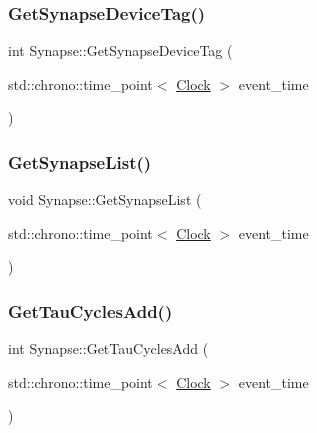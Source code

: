 \mbox{\label{classSynapse_a4fe6b49e46ebda6f34593d3df54d5593}} 
\subsubsection{\texorpdfstring{Get\+Synapse\+Device\+Tag()}{GetSynapseDeviceTag()}}
{\footnotesize\ttfamily int Synapse\+::\+Get\+Synapse\+Device\+Tag (\begin{DoxyParamCaption}\item[{std\+::chrono\+::time\+\_\+point$<$ \mbox{\hyperlink{universe_8h_a0ef8d951d1ca5ab3cfaf7ab4c7a6fd80}{Clock}} $>$}]{event\+\_\+time }\end{DoxyParamCaption})\hspace{0.3cm}{\ttfamily [inline]}}

\mbox{\label{classSynapse_a63f214e8ccef1f6625d5fecd36104efe}} 
\subsubsection{\texorpdfstring{Get\+Synapse\+List()}{GetSynapseList()}}
{\footnotesize\ttfamily void Synapse\+::\+Get\+Synapse\+List (\begin{DoxyParamCaption}\item[{std\+::chrono\+::time\+\_\+point$<$ \mbox{\hyperlink{universe_8h_a0ef8d951d1ca5ab3cfaf7ab4c7a6fd80}{Clock}} $>$}]{event\+\_\+time }\end{DoxyParamCaption})}

\mbox{\label{classSynapse_aeaf2f46a927a4aa7ad982e7da9d630d6}} 
\subsubsection{\texorpdfstring{Get\+Tau\+Cycles\+Add()}{GetTauCyclesAdd()}}
{\footnotesize\ttfamily int Synapse\+::\+Get\+Tau\+Cycles\+Add (\begin{DoxyParamCaption}\item[{std\+::chrono\+::time\+\_\+point$<$ \mbox{\hyperlink{universe_8h_a0ef8d951d1ca5ab3cfaf7ab4c7a6fd80}{Clock}} $>$}]{event\+\_\+time }\end{DoxyParamCaption})\hspace{0.3cm}{\ttfamily [inline]}}

